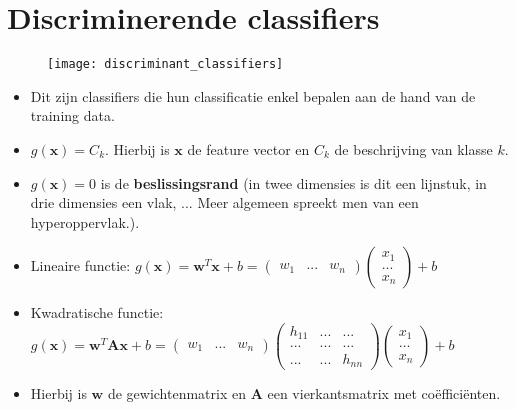 \section{Discriminerende classifiers}
\begin{figure}[ht]
	\centering
	\texttt{[image: discriminant\_classifiers]}
\end{figure}
\begin{itemize}
	\item Dit zijn classifiers die hun classificatie enkel bepalen aan de hand van de training data.
	\item $g(\textbf{x}) = C_k$. Hierbij is $\textbf{x}$ de feature vector en $C_k$ de beschrijving van klasse $k$.
	\item $g(\textbf{x}) = 0$ is de \textbf{beslissingsrand} (in twee dimensies is dit een lijnstuk, in drie dimensies een vlak, ... Meer algemeen spreekt men van een hyperoppervlak.).
	\item Lineaire functie:
	$g(\textbf{x}) = \textbf{w}^T\textbf{x} + b = \begin{pmatrix}w_1 & ... & w_n\end{pmatrix}\begin{pmatrix}
	x_1 \\ ... \\ x_n
	\end{pmatrix} + b$ 
		\item Kwadratische functie:
	$g(\textbf{x}) = \textbf{w}^T\textbf{A}\textbf{x} + b =  \begin{pmatrix}w_1 & ... & w_n\end{pmatrix}
	\begin{pmatrix}
	h_{11} & ... & ... \\
	... & ... & ... \\
	... & ... & h_{nn}
	\end{pmatrix}
	\begin{pmatrix}
	x_1 \\ ... \\ x_n
	\end{pmatrix} + b$ 
	\item Hierbij is $\textbf{w}$ de gewichtenmatrix en $\textbf{A}$ een vierkantsmatrix met coëfficiënten.
\end{itemize}

